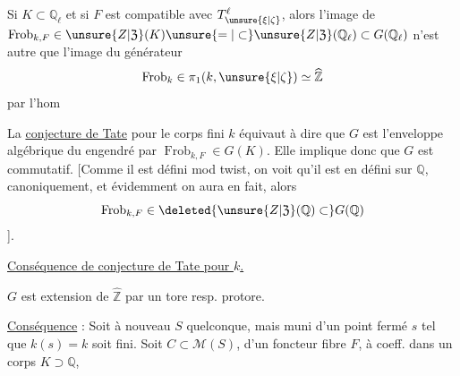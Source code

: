 Si $K\subset\mathbb{Q}_\ell$ et si $F$ est compatible avec
$T^\ell_{\unsure{\xi|\zeta}}$, alors l'image de
$\operatorname{Frob}_{k,F}\in\unsure{Z|\mathfrak Z}(K)
\unsure{=|\subset}\unsure{Z|\mathfrak Z}(\mathbb{Q}_\ell)\subset G(\mathbb{Q}_\ell)$
n'est autre que l'image du
générateur
\[
 \operatorname{Frob}_k\in\pi_1(k,\unsure{\xi|\zeta})\simeq\widehat{\mathbb{Z}}
\]
par l'hom

La \uline{conjecture de Tate} pour le corps
fini $k$ équivaut à dire que $G$ est
l'enveloppe algébrique du  engendré
par $\operatorname{Frob}_{k,F}\in G(K)$.
Elle implique donc
que $G$ est commutatif. [Comme il est
défini mod twist, on voit qu'il est en
 défini sur $\mathbb{Q}$, canoniquement, et
évidemment on aura en fait, alors
\[
 \operatorname{Frob}_{k,F}\in\deleted{\unsure{Z|\mathfrak Z}(\mathbb{Q})\subset}G(\mathbb{Q})
\]
].

\uline{Conséquence de conjecture de Tate pour $k$.}

$G$ est extension 
de $\widehat{\mathbb{Z}}$ par un tore resp. protore.

\uline{Conséquence} : Soit à nouveau $S$ quelconque,
mais muni d'un point fermé $s$ tel que
$k(s)=k$ soit fini. Soit $C\subset \mathcal{M}(S)$,
d'un foncteur fibre $F$,
à coeff. dans un corps $K\supset\mathbb{Q}$,
